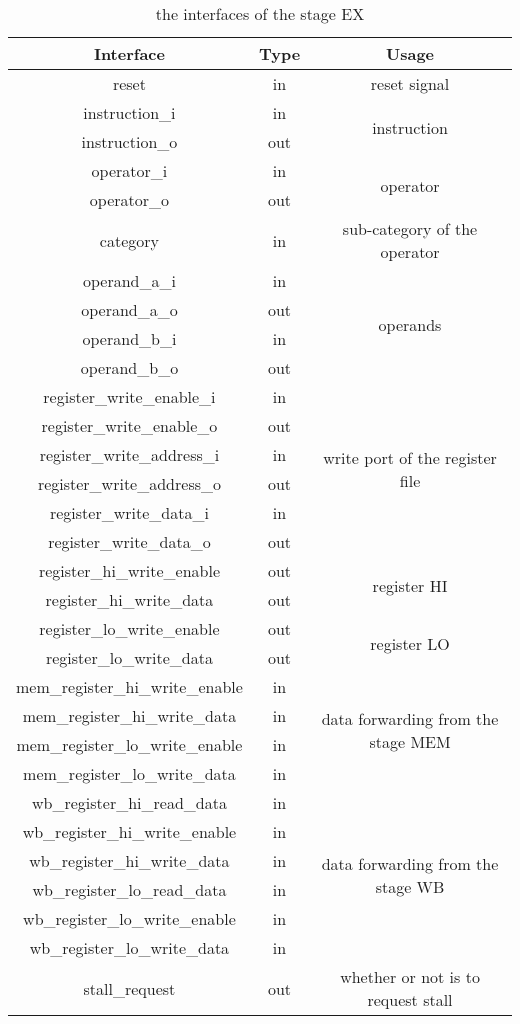 \begin{table}[!h]
\centering
\begin{tabular}{|c|c|c|}
\hline
Interface & Type & Usage \\ \hline
reset & in & reset signal \\ \hline
instruction\_i & in & \multirow{2}{*}{instruction} \\ \cline{1-2}
instruction\_o & out &  \\ \hline
operator\_i & in & \multirow{2}{*}{operator} \\ \cline{1-2}
operator\_o & out &  \\ \hline
category & in & sub-category of the operator \\ \hline
operand\_a\_i & in & \multirow{4}{*}{operands} \\ \cline{1-2}
operand\_a\_o & out &  \\ \cline{1-2}
operand\_b\_i & in &  \\ \cline{1-2}
operand\_b\_o & out &  \\ \hline
register\_write\_enable\_i & in & \multirow{6}{*}{write port of the register file} \\ \cline{1-2}
register\_write\_enable\_o & out &  \\ \cline{1-2}
register\_write\_address\_i & in &  \\ \cline{1-2}
register\_write\_address\_o & out &  \\ \cline{1-2}
register\_write\_data\_i & in &  \\ \cline{1-2}
register\_write\_data\_o & out &  \\ \hline
register\_hi\_write\_enable & out & \multirow{2}{*}{register HI} \\ \cline{1-2}
register\_hi\_write\_data & out &  \\ \hline
register\_lo\_write\_enable & out & \multirow{2}{*}{register LO} \\ \cline{1-2}
register\_lo\_write\_data & out &  \\ \hline
mem\_register\_hi\_write\_enable & in & \multirow{4}{*}{data forwarding from the stage MEM} \\ \cline{1-2}
mem\_register\_hi\_write\_data & in &  \\ \cline{1-2}
mem\_register\_lo\_write\_enable & in &  \\ \cline{1-2}
mem\_register\_lo\_write\_data & in &  \\ \hline
wb\_register\_hi\_read\_data & in & \multirow{6}{*}{data forwarding from the stage WB} \\ \cline{1-2}
wb\_register\_hi\_write\_enable & in &  \\ \cline{1-2}
wb\_register\_hi\_write\_data & in &  \\ \cline{1-2}
wb\_register\_lo\_read\_data & in &  \\ \cline{1-2}
wb\_register\_lo\_write\_enable & in &  \\ \cline{1-2}
wb\_register\_lo\_write\_data & in &  \\ \hline
stall\_request & out & whether or not is to request stall \\ \hline\end{tabular}
\caption{the interfaces of the stage EX}
\end{table}